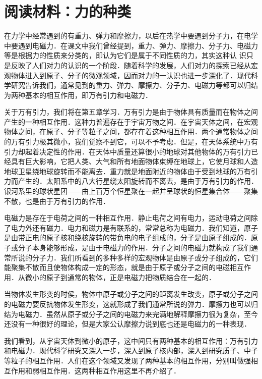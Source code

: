 \section*{阅读材料：力的种类}

在力学中经常遇到的有重力、弹力和摩擦力，以后在热学中要遇到分子力，在电学中要遇到电磁力．在课文中我们曾经提到，重力、弹力、摩擦力、分子力、电磁力等是根据力的性质来分类的，即认为它们是属于不同性质的力，其实这种认
识只是反映了人们对力的认识的一个阶段．随着科学的发展，人们对力的探索已经从宏观物体进入到原子、分子的微观领域，因而对力的一认识也进一步深化了．现代科学研究告诉我们，通常见到的重力、弹力、摩擦力、分子力、电磁力等都可以归结为两种基本的相互作用，即万有引力和电磁力．

关于万有引力，我们将在第五章学习．万有引力是由于物体具有质量而在物体之间产生的一种相互作用．这种力普遍存在于宇宙万物之间．在宇宙天体之间，在宏观物体之间，在原子、分子等粒子之间，都存在着这种相互作用．两个通常物体之间的万有引力极其微小，我们觉察不到它，可以不予考虑．但是，在天体系统中万有引力却起着决定性的作用．在天体中质量还算很小的地球对其他物体的万有引力已经具有巨大影响，它把人类、大气和所有地面物体束缚在地球上，它使月球和人造地球卫星绕地球旋转而不能离去．重力就是地面附近的物体由于受到地球的万有引力而产生的．太阳系中的八大行星绕太阳旋转而不离去，是由于万有引力的作用．银河系里的球状星团——由上百万个恒星聚在一起并呈球状的恒星集合体——聚集不散，也是由于万有引力的作用．

电磁力是存在于电荷之间的一种相互作用．静止电荷之间有电力，运动电荷之间除了电力外还有磁力．电力和磁力是有联系的，常常总称为电磁力．我们知道，原子是由带正电的原子核和绕核旋转的带负电的电子组成的，分子是由原子组成的．原子或分子本身能够形成，是由于电磁力的作用．分子之间的电磁力就构成了我们通常所说的分子力．我们所看到的多种多样的宏观物体是由原子或分子组成的，它们能聚集不散而且使物体构成一定的形态，就是由于原子或分子之间的电磁相互作用．从微小的原子到通常的物体，正是电磁力把物质结合在一起的．

当物体发生形变的时侯，物体中原子或分子之间的距离发生改变，原子或分子之间的电磁力要反抗物体发生形变，这就形成了我们通常所说的弹力．摩擦力也可以归结为电磁力．虽然从原子或分子之间的电磁力来完满地解释摩擦力很为复杂，至今还没有一种很好的理论，但是大家公认摩擦力说到底也还是电磁力的一种表现．

我们看到，从宇宙天体到微小的原子，这中间只有两种基本的相互作用：万有引力和电磁力．现代科学研究又深入一步，深入到原子核内部，深入到研究质子、中子等粒子的相互作用．人们在这个领域又发现了两种基本的相互作用，分别叫做强相互作用和弱相互作用．这两种相互作用这里不再介绍了．

